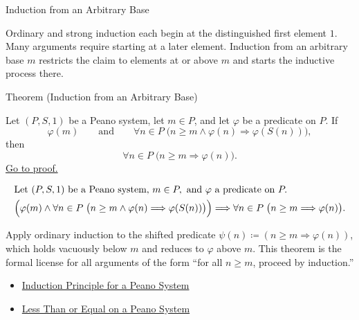 \label{sec:induction-principles}

\begin{topicbox}{Induction from an Arbitrary Base}
\begin{exposition}
Ordinary and strong induction each begin at the distinguished first element
$1$. Many arguments require starting at a later element. Induction from an
arbitrary base $m$ restricts the claim to elements at or above $m$ and
starts the inductive process there.
\end{exposition}

\begin{theorembox}{Theorem (Induction from an Arbitrary Base)}
\begin{theorem}
\label{thm:induction-from-arbitrary-base}
Let $(P,S,1)$ be a Peano system, let $m \in P$, and let $\varphi$ be a
predicate on $P$. If
\[
\varphi(m)
\qquad\text{and}\qquad
\forall n \in P\;\bigl(n \ge m \land \varphi(n) \Longrightarrow \varphi(S(n))\bigr),
\]
then
\[
\forall n \in P\;\bigl(n \ge m \Longrightarrow \varphi(n)\bigr).
\]
\hyperref[prf:induction-from-arbitrary-base]{Go to proof.}
\end{theorem}
\end{theorembox}

\begin{remark*}
\[
\begin{aligned}
&\text{Let } (P,S,1) \text{ be a Peano system, } m \in P,
\text{ and } \varphi \text{ a predicate on } P.\\
&\Bigl(\varphi(m) \land
\forall n \in P\;\bigl(n \ge m \land \varphi(n)
\Longrightarrow \varphi(S(n))\bigr)\Bigr)
\Longrightarrow
\forall n \in P\;\bigl(n \ge m \Longrightarrow \varphi(n)\bigr).
\end{aligned}
\]
\end{remark*}

\begin{remark*}[Interpretation]
Apply ordinary induction to the shifted predicate $\psi(n) \coloneqq
(n \ge m \Longrightarrow \varphi(n))$, which holds vacuously below $m$
and reduces to $\varphi$ above $m$. This theorem is the formal license for
all arguments of the form ``for all $n \ge m$, proceed by induction.''
\end{remark*}

\begin{dependencies}
\begin{itemize}
  \item \hyperref[thm:induction-principle-for-peano-system]{Induction Principle for a Peano System}
  \item \hyperref[def:less-than-or-equal-on-peano-system]{Less Than or Equal on a Peano System}
\end{itemize}
\end{dependencies}
\end{topicbox}
